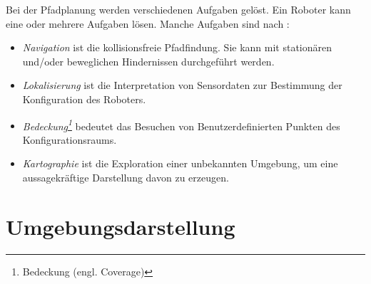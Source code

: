 Bei der Pfadplanung werden verschiedenen Aufgaben gelöst. Ein Roboter kann eine oder mehrere Aufgaben lösen. Manche Aufgaben sind nach \cite[~S. 9,10]{Principles:05}:
\begin{itemize}
	\item \textit{Navigation} ist die kollisionsfreie Pfadfindung. Sie kann mit stationären und/oder beweglichen Hindernissen durchgeführt werden.
	\item \textit{Lokalisierung} ist die Interpretation von Sensordaten zur Bestimmung der Konfiguration des Roboters.
	\item \textit{Bedeckung\footnote{Bedeckung (engl. Coverage)}} bedeutet das Besuchen von Benutzerdefinierten Punkten des Konfigurationsraums.
	\item \textit{Kartographie} ist die Exploration einer unbekannten Umgebung, um eine aussagekräftige Darstellung davon zu erzeugen.
\end{itemize}

\section{Umgebungsdarstellung}

